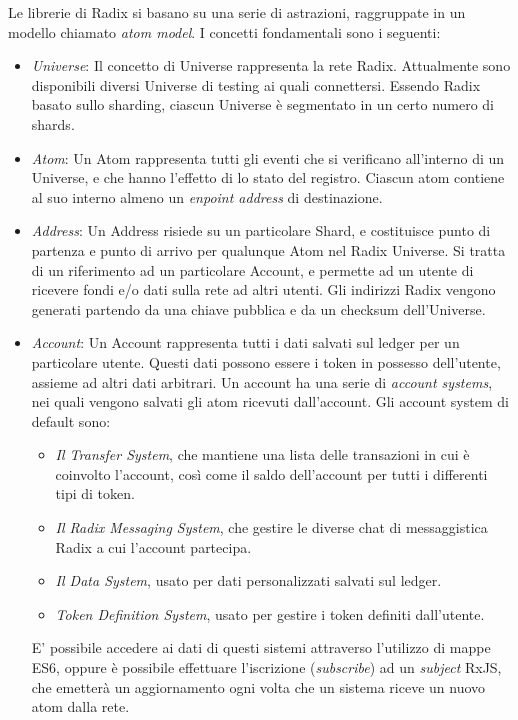 Le librerie di Radix si basano su una serie di astrazioni, raggruppate in un modello chiamato \textit{atom model}. I concetti fondamentali sono i seguenti:
\begin{itemize}
    \item \textit{Universe}: Il concetto di Universe rappresenta la rete Radix. Attualmente sono disponibili diversi Universe di testing ai quali connettersi. Essendo Radix basato sullo sharding, ciascun Universe è segmentato in un certo numero di shards.
    \item \textit{Atom}: Un Atom rappresenta tutti gli eventi che si verificano all'interno di un Universe, e che hanno l'effetto di lo stato del registro. Ciascun atom contiene al suo interno almeno un \textit{enpoint address} di destinazione.
    \item \textit{Address}: Un Address risiede su un particolare Shard, e costituisce punto di partenza e punto di arrivo per qualunque Atom nel Radix Universe. Si tratta di un riferimento ad un particolare Account, e permette ad un utente di ricevere fondi e/o dati sulla rete ad altri utenti. Gli indirizzi Radix vengono generati partendo da una chiave pubblica e da un checksum dell'Universe. 
    \item \textit{Account}: Un Account rappresenta tutti i dati salvati sul ledger per un particolare utente. Questi dati possono essere i token in possesso dell'utente, assieme ad altri dati arbitrari. Un account ha una serie di \textit{account systems}, nei quali vengono salvati gli atom ricevuti dall'account. Gli account system di default sono:
    \begin{itemize}
        \item \textit{Il Transfer System}, che mantiene una lista delle transazioni in cui è coinvolto l'account, così come il saldo dell'account per tutti i differenti tipi di token.
        \item \textit{Il Radix Messaging System}, che gestire le diverse chat di messaggistica Radix a cui l'account partecipa.
        \item \textit{Il Data System}, usato per dati personalizzati salvati sul ledger.
        \item \textit{Token Definition System}, usato per gestire i token definiti dall'utente.
    \end{itemize}
    E' possibile accedere ai dati di questi sistemi attraverso l'utilizzo di mappe ES6, oppure è possibile effettuare l'iscrizione (\textit{subscribe}) ad un \textit{subject} RxJS, che emetterà un aggiornamento ogni volta che un sistema riceve un nuovo atom dalla rete.

\end{itemize}
